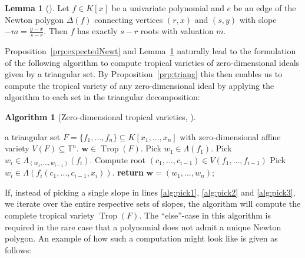 \documentclass[
  paper=a4,
  titlepage,
  bibliography=totoc,
  pagesize=pdftex
]{scrartcl}
\numberwithin{figure}{section}
\numberwithin{equation}{section}
\numberwithin{table}{section}
\newcommand*\setT{\mathds{T}}
\let\vec\mathbf
\DeclareMathOperator{\Trop}{Trop}
\theoremstyle{definition}
\newtheorem{lemma}[definition]{Lemma}
\newtheorem{algo}[definition]{Algorithm}
\numberwithin{definition}{section}
\begin{document}
\begin{lemma}[{\cite[Proposition~II.6.3]{neuAlg}}]
  Let $f \in K[x]$ be a univariate polynomial and $e$ be an edge of the Newton polygon
  $\Delta(f)$ connecting vertices $(r,x)$ and $(s, y)$ with slope $-m = \frac{y-x}{s-r}$.
  Then $f$ has exactly $s-r$ roots with valuation $m$.
  \label{lem:newtPolyRoots}
\end{lemma}

Proposition~\ref{prp:expectedNewt} and Lemma~\ref{lem:newtPolyRoots} naturally lead to the
formulation of the following algorithm to compute tropical varieties of zero-dimensional
ideals given by a triangular set. By Proposition~\ref{prp:triang} this then enables us to
compute the tropical variety of any zero-dimensional ideal by applying the algorithm to
each set in the triangular decomposition:

\begin{algo}[Zero-dimensional tropical varieties,
  {\cite[Algorithm~2.10]{tropPointsLinks}}]\
  \begin{algorithmic}[1]
    \Require a triangular set $F = \{f_1, \dots, f_n\} \subseteq K[x_1, \dots, x_n]$ with
    zero-dimensional affine variety $V(F) \subseteq \setT^n$.
    \Ensure $\vec w \in \Trop(F)$.
    \State Pick $w_1 \in \Lambda(f_1)$.
    \label{alg:pick1}
        \State Pick $w_i \in \Lambda_{(w_1, \dots, w_{i-1})}(f_i)$.
        \label{alg:pick2}
      \Else
        \State Compute root $(c_1, \dots, c_{i-1}) \in V(f_1, \dots, f_{i-1})$
        \State Pick $w_i \in \Lambda(f_i(c_1, \dots, c_{i-1}, x_i))$.
        \label{alg:pick3}
      \EndIf
    \EndFor
    \State \textbf{return} $\vec w = (w_1, \dots, w_n)$;
  \end{algorithmic}
  \label{alg:zeroDimTrop}
\end{algo}

If, instead of picking a single slope in lines \ref{alg:pick1}, \ref{alg:pick2} and
\ref{alg:pick3}, we iterate over the entire respective sets of slopes, the algorithm will
compute the complete tropical variety $\Trop(F)$. The \enquote{else}-case in this
algorithm is required in the rare case that a polynomial does not admit a unique Newton
polygon. An example of how such a computation might look like is given as follows:
\end{document}
